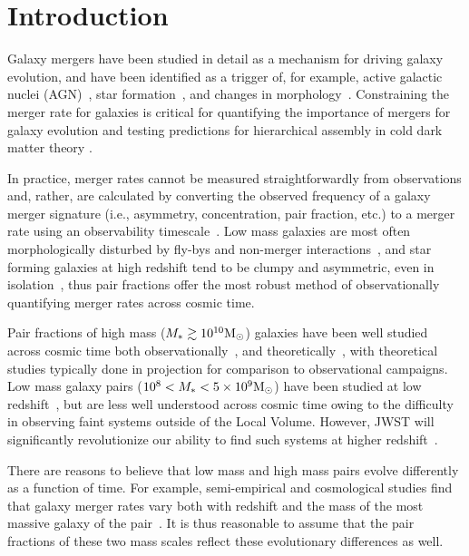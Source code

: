 \documentclass[twocolumn]{aastex631}
\begin{document}
\section{Introduction} \label{sec:intro}
    Galaxy mergers have been studied in detail as a mechanism for driving galaxy evolution, and have been identified as a trigger of, for example, 
    active galactic nuclei (AGN)~\citep[e.g.][]{Hopkins2008,Comerford2015,Blecha2018,Ellison2019}, 
    star formation~\citep[e.g.][]{Mihos1996, DiMatteo2008,Patton2013, Hopkins2013,Patton2020,Hani2020}, 
    and changes in morphology~\citep[e.g.][]{Conselice2003,Lotz2008,Casteels2014,RG2017,Guzman-Ortega2023}. 
    Constraining the merger rate for galaxies is critical for quantifying the importance of mergers for galaxy evolution and testing predictions for hierarchical assembly in cold dark matter theory \citep[e.g.][]{Stewart2009,Hopkins2010,RG2015}.

    In practice, merger rates cannot be measured straightforwardly from observations and, rather, are calculated by converting the observed frequency of a galaxy merger signature (i.e., asymmetry, concentration, pair fraction, etc.) to a merger rate using an observability timescale~\citep[e.g.][]{Lotz2011}. 
    Low mass galaxies are most often morphologically disturbed by fly-bys and non-merger interactions~\citep{Martin2021}, and star forming galaxies at high redshift tend to be clumpy and asymmetric, even in isolation~\citep{Wuyts2013}, thus pair fractions offer the most robust method of observationally quantifying merger rates across cosmic time. 

    Pair fractions of high mass ($M_*\gtrsim10^{10}\mathrm{M}_\odot$) galaxies have been well studied across cosmic time both observationally~\citep[e.g.][]{Patton2000,Lotz2011,Ferreras2014, Man2016,Duncan2019}, and theoretically~\citep[e.g.][]{RG2015,Snyder2017,Snyder2023}, with theoretical studies typically done in projection for comparison to observational campaigns. 
    Low mass galaxy pairs ($10^8<M_*<5\times10^9\mathrm{M}_\odot$) have been studied at low redshift~\citep[e.g.][]{Stierwalt2015,Pearson2016,Besla2018,Paudel2018,Luber2022},
    but are less well understood across cosmic time owing to the difficulty in observing faint systems outside of the Local Volume. 
    However, JWST will significantly revolutionize our ability to find such systems at higher redshift~\citep{Behroozi2020}.
    
    There are reasons to believe that low mass and high mass pairs evolve differently as a function of time.
    For example, semi-empirical and cosmological studies find that galaxy merger rates vary both with redshift and the mass of the most massive galaxy of the pair~\citep[see e.g.][]{Stewart2009,Hopkins2010,RG2015}.
    It is thus reasonable to assume that the pair fractions of these two mass scales reflect these evolutionary differences as well. 
    
\end{document}
